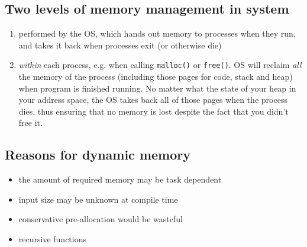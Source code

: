 \subsection*{Two levels of memory management in system}

\begin{enumerate}
\item performed by the OS, which hands out memory to processes when they run, and takes it back when processes exit (or otherwise die)
\item \emph{within} each process, e.g. when calling \texttt{malloc()} or \texttt{free()}.  OS will reclaim \emph{all} the memory of the process (including those pages for code, stack and heap) when program is finished running. No matter what the state of your heap in your address space, the OS takes back all of those pages when the process dies, thus ensuring that no memory is lost despite the fact that you didn’t free it.
\end{enumerate}
\subsection*{Reasons for dynamic memory}
\begin{itemize}
\item the amount of required memory may be task dependent
\item input size may be unknown at compile time
\item conservative pre-allocation would be wasteful
\item recursive functions
\end{itemize}

